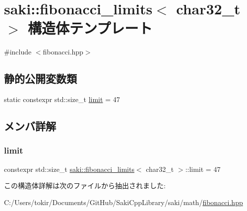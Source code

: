\hypertarget{structsaki_1_1fibonacci__limits_3_01char32__t_01_4}{}\section{saki\+:\+:fibonacci\+\_\+limits$<$ char32\+\_\+t $>$ 構造体テンプレート}
\label{structsaki_1_1fibonacci__limits_3_01char32__t_01_4}


{\ttfamily \#include $<$fibonacci.\+hpp$>$}

\subsection*{静的公開変数類}
\begin{DoxyCompactItemize}
\item 
static constexpr std\+::size\+\_\+t \mbox{\hyperlink{structsaki_1_1fibonacci__limits_3_01char32__t_01_4_acf2b561aca41b7f275abf992c4504c6d}{limit}} = 47
\end{DoxyCompactItemize}


\subsection{メンバ詳解}
\mbox{\label{structsaki_1_1fibonacci__limits_3_01char32__t_01_4_acf2b561aca41b7f275abf992c4504c6d}} 
\subsubsection{\texorpdfstring{limit}{limit}}
{\footnotesize\ttfamily constexpr std\+::size\+\_\+t \mbox{\hyperlink{structsaki_1_1fibonacci__limits}{saki\+::fibonacci\+\_\+limits}}$<$ char32\+\_\+t $>$\+::limit = 47\hspace{0.3cm}{\ttfamily [static]}}



この構造体詳解は次のファイルから抽出されました\+:\begin{DoxyCompactItemize}
\item 
C\+:/\+Users/tokir/\+Documents/\+Git\+Hub/\+Saki\+Cpp\+Library/saki/math/\mbox{\hyperlink{fibonacci_8hpp}{fibonacci.\+hpp}}\end{DoxyCompactItemize}
